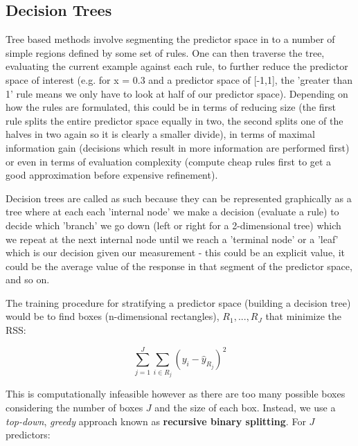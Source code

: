 \subsection{Decision Trees}

Tree based methods involve segmenting the predictor space in to a number of simple regions defined by some set of rules. One can then traverse the tree, evaluating the current example against each rule, to further reduce the predictor space of interest (e.g. for x = 0.3 and a predictor space of [-1,1], the 'greater than 1' rule means we only have to look at half of our predictor space). Depending on how the rules are formulated, this could be in terms of reducing size (the first rule splits the entire predictor space equally in two, the second splits one of the halves in two again so it is clearly a smaller divide), in terms of maximal information gain (decisions which result in more information are performed first) or even in terms of evaluation complexity (compute cheap rules first to get a good approximation before expensive refinement).

Decision trees are called as such because they can be represented graphically as a tree where at each each 'internal node' we make a decision (evaluate a rule) to decide which 'branch' we go down (left or right for a 2-dimensional tree) which we repeat at the next internal node until we reach a 'terminal node' or a 'leaf' which is our decision given our measurement - this could be an explicit value, it could be the average value of the response in that segment of the predictor space, and so on.

The training procedure for stratifying a predictor space (building a decision tree) would be to find boxes (n-dimensional rectangles), $R_{1},...,R_{J}$ that minimize the RSS: 

$$ \sum^{J}_{j=1}\sum_{i\in R_{j}} (y_{i}-\hat{y}_{R_{j}})^{2} $$

This is computationally infeasible however as there are too many possible boxes considering the number of boxes $J$ and the size of each box. Instead, we use a \textit{top-down}, \textit{greedy} approach known as \textbf{recursive binary splitting}. For $J$ predictors:

